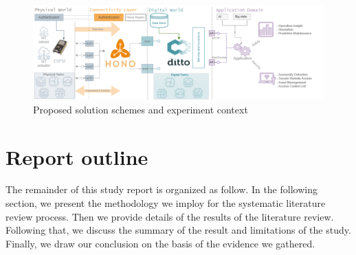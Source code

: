 \begin{figure}[h!]
    \centering
    \includegraphics[width=1\textwidth]{images/ps-scheme2.png}
    \caption{Proposed solution schemes and experiment context}
    \label{fig:ps-scheme}
\end{figure}

\section{Report outline}
The remainder of this study report is organized as follow. In the following section, we present the methodology we imploy for the systematic literature review process. Then we provide details of the results of the literature review. Following that, we discuss the summary of the result and limitations of the study. Finally, we draw our conclusion on the basis of the evidence we gathered.   


